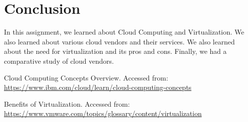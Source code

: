 \documentclass[11pt]{article}
\begin{document}
% 

\section{Conclusion}
In this assignment, we learned about Cloud Computing and Virtualization. We also learned about various cloud vendors and their services. We also learned about the need for virtualization and its pros and cons. Finally, we had a comparative study of cloud vendors.

\clearpage

\pagebreak
\begin{thebibliography}{}

    Cloud Computing Concepts Overview.
    Accessed from: \url{https://www.ibm.com/cloud/learn/cloud-computing-concepts}

    Benefits of Virtualization.
    Accessed from: \url{https://www.vmware.com/topics/glossary/content/virtualization}

\end{thebibliography}
\end{document}
